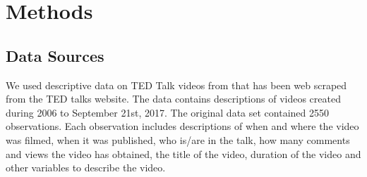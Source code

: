 \section{Methods}
\subsection{Data Sources}
We used descriptive data on TED Talk videos from that has been web scraped from the TED talks website. The data contains descriptions of videos created during 2006 to September 21st, 2017. The original data set contained 2550 observations. Each observation includes descriptions of when and where the video was filmed, when it was published, who is/are in the talk, how many comments and views the video has obtained, the title of the video, duration of the video and other variables to describe the video.